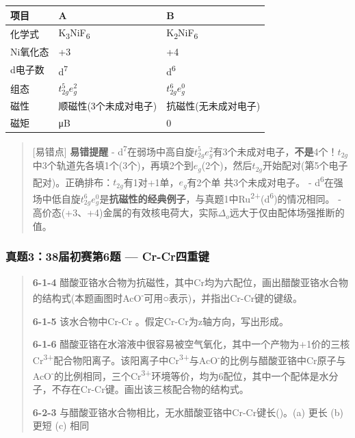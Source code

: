 {\def\LTcaptype{none} %
\begin{longtable}[]{@{}lll@{}}
\toprule\noalign{}
项目 & A & B \\
\midrule\noalign{}
\endhead
\bottomrule\noalign{}
\endlastfoot
化学式 & K\textsubscript{3}NiF\textsubscript{6} & K\textsubscript{2}NiF\textsubscript{6} \\
Ni氧化态 & +3 & +4 \\
d电子数 & d\textsuperscript{7} & d\textsuperscript{6} \\
组态 & \(t_{2g}^{5}e_{g}^{2}\) & \(t_{2g}^{6}e_{g}^{0}\) \\
磁性 & 顺磁性(3个未成对电子) & 抗磁性(无未成对电子) \\
磁矩 &  3.87 μB & 0 \\
\end{longtable}
}

\begin{quote}
{[}易错点{]} \textbf{易错提醒}
- d\textsuperscript{7}在弱场中高自旋\(t_{2g}^{5}e_{g}^{2}\)有3个未成对电子，\textbf{不是}4个！\(t_{2g}\)中3个轨道先各填1个(3个)，再填2个到\(e_g\)(2个)，然后\(t_{2g}\)开始配对(第5个电子配对)。正确排布：\(t_{2g}\)有1对+1单，\(e_g\)有2个单 \箭 共3个未成对电子。
- d\textsuperscript{6}在强场中低自旋\(t_{2g}^{6}e_{g}^{0}\)是\textbf{抗磁性的经典例子}，与真题1中Ru\textsuperscript{2+}(d\textsuperscript{6})的情况相同。
- 高价态(+3、+4)金属的有效核电荷大，实际\(\Delta_o\)远大于仅由配体场强推断的值。
\end{quote}

\subsubsection{真题3：38届初赛第6题 --- Cr-Cr四重键}\label{ux771fux9898338ux5c4aux521dux8d5bux7b2c6ux9898-cr-crux56dbux91cdux952e}

\begin{quote}
\textbf{6-1-4} 醋酸亚铬水合物为抗磁性，其中Cr均为六配位，画出醋酸亚铬水合物的结构式(本题画图时AcO\textsuperscript{-}可用○表示)，并指出Cr-Cr键的键级。

\textbf{6-1-5} 该水合物中Cr-Cr 。假定Cr-Cr为z轴方向，写出形成。

\textbf{6-1-6} 醋酸亚铬在水溶液中很容易被空气氧化，其中一个产物为+1价的三核Cr\textsuperscript{3+}配合物阳离子。该阳离子中Cr\textsuperscript{3+}与AcO\textsuperscript{-}的比例与醋酸亚铬中Cr原子与AcO\textsuperscript{-}的比例相同，三个Cr\textsuperscript{3+}环境等价，均为6配位，其中一个配体是水分子，不存在Cr-Cr键。画出该三核配合物的结构式。

\textbf{6-2-3} 与醋酸亚铬水合物相比，无水醋酸亚铬中Cr-Cr键长()。(a) 更长 (b) 更短 (c) 相同
\end{quote}

